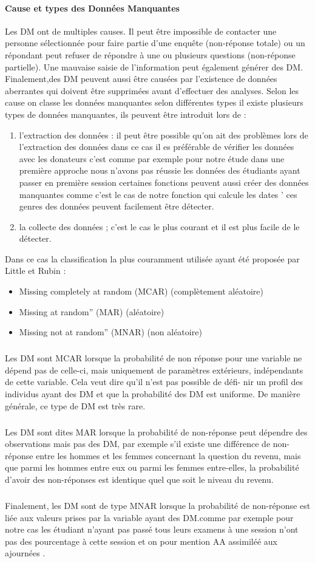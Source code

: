 \paragraph{Cause et types des Données Manquantes} \cite{MissinVal}
Les \ac{DM} ont de multiples causes. Il peut être
impossible de contacter une personne sélectionnée pour faire partie
d'une enquête (non-réponse totale) ou un répondant peut refuser de
répondre à une ou plusieurs questions (non-réponse partielle). Une
mauvaise saisie de l'information peut également générer des \ac{DM}.
Finalement,des \ac{DM} peuvent aussi être causées par l'existence de données
aberrantes qui doivent être supprimées avant d'effectuer des analyses.
Selon les cause on classe les données manquantes selon différentes types
il existe plusieurs types de données manquantes, ils peuvent être introduit lors de :
\begin{enumerate}
\item  l'extraction des données :
il peut être possible qu'on ait des problèmes lors de l'extraction des données 
dans ce cas il es préférable de vérifier les données avec les donateurs c'est comme par exemple pour notre étude dans une première approche nous n'avons pas réussie les données des étudiants ayant passer en première session 
certaines fonctions peuvent aussi créer des données manquantes comme c'est le cas de notre fonction qui calcule les dates '
ces genres des données peuvent facilement être détecter.
\item  la collecte des données ;
c'est le cas le plus courant et il est plus facile de le détecter.
\end{enumerate}

Dans ce cas la classification la plus couramment utilisée ayant été
proposée par Little et Rubin \cite{MissinVal} : 
\begin{itemize}
	\item  Missing completely at random (MCAR) (complètement aléatoire)
	\item Missing at random'' (MAR) (aléatoire)
	\item Missing not at random'' (MNAR) (non aléatoire)
\end{itemize}
\subparagraph{}
 Les DM sont MCAR lorsque la probabilité de non réponse pour une variable ne
dépend pas de celle-ci, mais uniquement de paramètres extérieurs,
indépendants de cette variable. Cela veut dire qu'il n'est pas possible
de défi- nir un profil des individus ayant des DM et que la probabilité
des DM est uniforme. De manière générale, ce type de DM est très rare.
\subparagraph{}
Les DM sont dites MAR lorsque la probabilité de non-réponse peut
dépendre des observations mais pas des DM, par exemple s'il existe une
différence de non-réponse entre les hommes et les femmes concernant la
question du revenu, mais que parmi les hommes entre eux ou parmi les
femmes entre-elles, la probabilité d'avoir des non-réponses est
identique quel que soit le niveau du revenu.
\subparagraph{}
Finalement, les DM sont de type MNAR lorsque la probabilité de
non-réponse est liée aux valeurs prises par la variable ayant des
DM.comme par exemple pour notre cas les étudiant n'ayant pas passé tous
leurs examens à une session n'ont pas des pourcentage à cette session et
on pour mention AA assimiléé aux ajournées .

